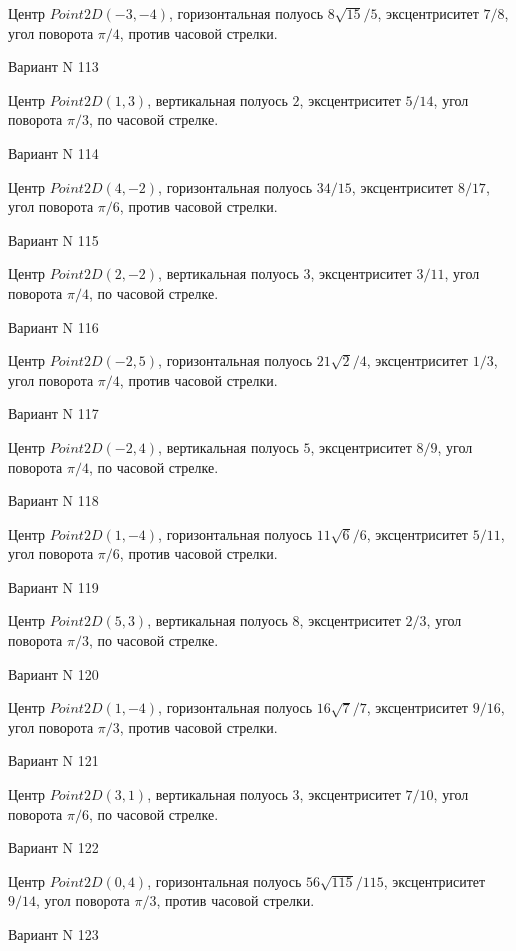 \documentclass[11pt]{report}
\begin{document}
Центр $Point2D\left(-3, -4\right)$, горизонтальная полуось $8 \sqrt{15} / 5$, эксцентриситет $7 / 8$, угол поворота $\pi / 4$, против часовой стрелки.

Вариант N 113

Центр $Point2D\left(1, 3\right)$, вертикальная полуось $2$, эксцентриситет $5 / 14$, угол поворота $\pi / 3$, по часовой стрелке.

Вариант N 114

Центр $Point2D\left(4, -2\right)$, горизонтальная полуось $34 / 15$, эксцентриситет $8 / 17$, угол поворота $\pi / 6$, против часовой стрелки.

Вариант N 115

Центр $Point2D\left(2, -2\right)$, вертикальная полуось $3$, эксцентриситет $3 / 11$, угол поворота $\pi / 4$, по часовой стрелке.

Вариант N 116

Центр $Point2D\left(-2, 5\right)$, горизонтальная полуось $21 \sqrt{2} / 4$, эксцентриситет $1 / 3$, угол поворота $\pi / 4$, против часовой стрелки.

Вариант N 117

Центр $Point2D\left(-2, 4\right)$, вертикальная полуось $5$, эксцентриситет $8 / 9$, угол поворота $\pi / 4$, по часовой стрелке.

Вариант N 118

Центр $Point2D\left(1, -4\right)$, горизонтальная полуось $11 \sqrt{6} / 6$, эксцентриситет $5 / 11$, угол поворота $\pi / 6$, против часовой стрелки.

Вариант N 119

Центр $Point2D\left(5, 3\right)$, вертикальная полуось $8$, эксцентриситет $2 / 3$, угол поворота $\pi / 3$, по часовой стрелке.

Вариант N 120

Центр $Point2D\left(1, -4\right)$, горизонтальная полуось $16 \sqrt{7} / 7$, эксцентриситет $9 / 16$, угол поворота $\pi / 3$, против часовой стрелки.

Вариант N 121

Центр $Point2D\left(3, 1\right)$, вертикальная полуось $3$, эксцентриситет $7 / 10$, угол поворота $\pi / 6$, по часовой стрелке.

Вариант N 122

Центр $Point2D\left(0, 4\right)$, горизонтальная полуось $56 \sqrt{115} / 115$, эксцентриситет $9 / 14$, угол поворота $\pi / 3$, против часовой стрелки.

Вариант N 123
\end{document}

